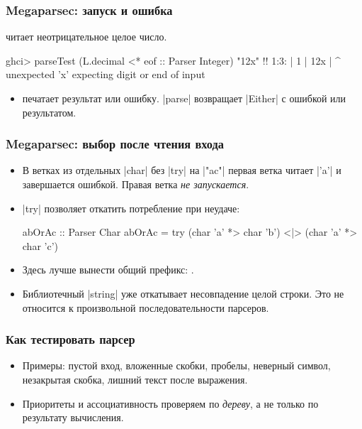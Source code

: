 \documentclass[11pt]{beamer}
\begin{document}
\begin{frame}[fragile]
  \frametitle{Megaparsec: запуск и ошибка}
  \href{https://hackage.haskell.org/package/megaparsec/docs/Text-Megaparsec-Char-Lexer.html#v:decimal}{} читает неотрицательное целое число.
  \begin{haskellsmall}
    ghci> parseTest (L.decimal <* eof :: Parser Integer) "12x" !\pause!
    1:3:
      |
    1 | 12x
      |   ^
    unexpected 'x'
    expecting digit or end of input
  \end{haskellsmall}
  \begin{itemize}
    \item \href{https://hackage.haskell.org/package/megaparsec/docs/Text-Megaparsec.html}{} печатает результат или ошибку. \haskinline|parse| возвращает \haskinline|Either| с ошибкой или результатом.
  \end{itemize}
\end{frame}

\begin{frame}[fragile]
  \frametitle{Megaparsec: выбор после чтения входа}
  \begin{itemize}
    \item В ветках из отдельных \haskinline|char| без \haskinline|try| на \haskinline|"ac"| первая ветка читает \haskinline|'a'| и завершается ошибкой. Правая ветка \emph{не запускается}.
      \pause
    \item \haskinline|try| позволяет откатить потребление при неудаче:
      \begin{haskellsmall}
        abOrAc :: Parser Char
        abOrAc = try (char 'a' *> char 'b')
             <|> (char 'a' *> char 'c')
      \end{haskellsmall}
    \item Здесь лучше вынести общий префикс: .
    \item Библиотечный \haskinline|string| уже откатывает несовпадение целой строки. Это не относится к произвольной последовательности парсеров.
  \end{itemize}
\end{frame}

\begin{frame}[fragile]
  \frametitle{Как тестировать парсер}
  \begin{itemize}
    \item Примеры: пустой вход, вложенные скобки, пробелы, неверный символ, незакрытая скобка, лишний текст после выражения.
    \item Приоритеты и ассоциативность проверяем по \emph{дереву}, а не только по результату вычисления.
  \end{itemize}
\end{frame}
\end{document}

